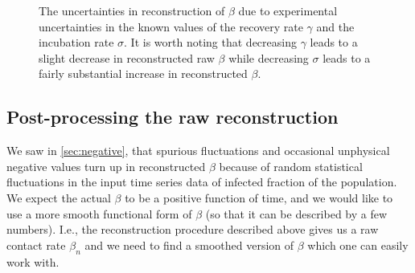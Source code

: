 \documentclass[aps,prd,10pt,twocolumn,nofootinbib]{revtex4-2}
\begin{document}
\begin{figure}[htp]
  \centering
  \hspace*{-1cm} 
  \quad
  \caption{
The uncertainties in reconstruction of $\beta$ due to experimental uncertainties in the known values of the recovery rate $\gamma$ and the incubation rate $\sigma$.
It is worth noting that decreasing $\gamma$ leads to a slight decrease in reconstructed raw $\beta$ while decreasing $\sigma$ leads to a fairly substantial increase in reconstructed $\beta$. 
  }
   \label{effect-change}
\end{figure}

\subsection{Post-processing the raw reconstruction}
\label{sec:postprocess}

We saw in \textsection \ref{sec:negative}, that spurious fluctuations and occasional unphysical negative values turn up in reconstructed $\beta$ because of random statistical fluctuations in the input time series data of infected fraction of the population.
We expect the actual $\beta$ to be a positive function of time, and we would like to use a more smooth functional form of $\beta$ (so that it can be described by a few numbers). 
I.e., the reconstruction procedure described above gives us a raw contact rate $\beta_n$ and we need to find a smoothed version of $\beta$ which one can easily work with.
\end{document}
